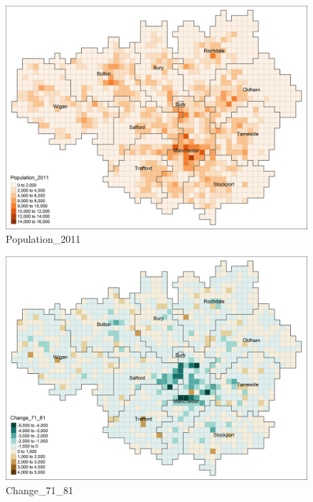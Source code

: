 \documentclass[
]{article}
\begin{document}
\begin{figure}
\centering
\includegraphics{Population_2011.png}
\caption{Population\_2011}
\end{figure}

\begin{figure}
\centering
\includegraphics{Change_71_81.png}
\caption{Change\_71\_81}
\end{figure}
\end{document}

